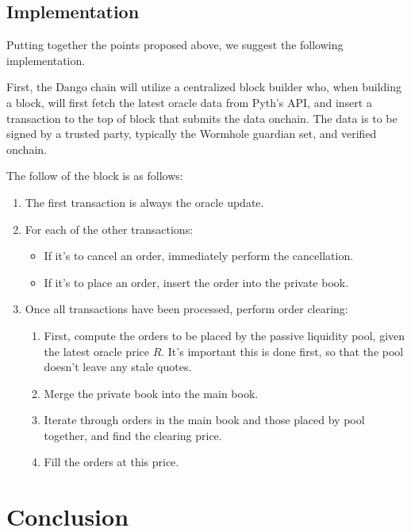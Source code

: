 \documentclass{article}
\begin{document}
\subsection{Implementation}

Putting together the points proposed above, we suggest the following implementation.

First, the Dango chain will utilize a centralized block builder who, when building a block, will first fetch the latest oracle data from Pyth's API, and insert a transaction to the top of block that submits the data onchain. The data is to be signed by a trusted party, typically the Wormhole guardian set,\supercite{wormholeguardianset} and verified onchain.

The follow of the block is as follows:

\begin{enumerate}
  \item The first transaction is always the oracle update.
  \item For each of the other transactions:
        \begin{itemize}
          \item If it's to cancel an order, immediately perform the cancellation.
          \item If it's to place an order, insert the order into the private book.
        \end{itemize}
  \item Once all transactions have been processed, perform order clearing:
        \begin{enumerate}
          \item First, compute the orders to be placed by the passive liquidity pool, given the latest oracle price $R$. It's important this is done first, so that the pool doesn't leave any stale quotes.
          \item Merge the private book into the main book.
          \item Iterate through orders in the main book and those placed by pool together, and find the clearing price.
          \item Fill the orders at this price.
        \end{enumerate}
\end{enumerate}

\section{Conclusion}
\end{document}
